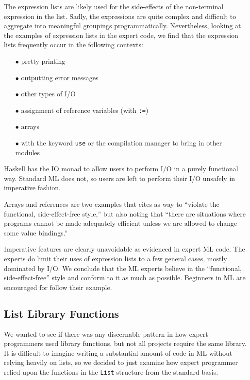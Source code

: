 \documentclass[12pt,abstracton]{scrartcl}
\begin{document}
The expression lists are likely used for the side-effects of the non-terminal
expression in the list. Sadly, the expressions are quite complex and difficult
to aggregate into meaningful groupings programmatically. Nevertheless,
looking at the examples of expression lists in the expert code, we find that
the expression lists frequently occur in the following contexts:
\begin{itemize}
\item[$\bullet$] pretty printing
\item[$\bullet$] outputting error messages
\item[$\bullet$] other types of I/O
\item[$\bullet$] assignment of reference variables (with \texttt{:=})
\item[$\bullet$] arrays
\item[$\bullet$] with the keyword \texttt{use} or the compilation manager to bring in other modules
\end{itemize}

Haskell has the IO monad to allow users to perform I/O in a purely functional way. \cite{Jon93}
Standard ML does not, so users are left to perform their
I/O unsafely in imperative fashion.

Arrays and references are two examples that \cite{Ull98} cites as way to ``violate the functional,
side-effect-free style,'' but also noting that ``there are situations where programs cannot
be made adequately efficient unless we are allowed to change some value bindings.''

Imperative features are clearly unavoidable as evidenced in expert ML code. The experts do
limit their uses of expression lists to a few general cases, mostly dominated by I/O.
We conclude that the ML experts believe in the ``functional, side-effect-free'' style
and conform to it as much as possible. Beginners in ML are encouraged for follow their example.
\subsection{List Library Functions}\label{subsec:imp}
We wanted to see if there was any discernable pattern in how expert programmers
used library functions, but not all projects require the same library.
It is difficult to imagine writing a substantial amount of code in ML without
relying heavily on lists, so we decided to just examine how expert programmer relied upon the functions
in the \texttt{List} structure from the standard basis.
\end{document}
